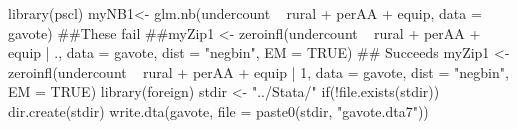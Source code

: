 \begin{Schunk}
\begin{Sinput}
 library(pscl)
 myNB1<- glm.nb(undercount ~ rural + perAA + equip, data = gavote)
 ##These fail
 ##myZip1 <- zeroinfl(undercount ~ rural + perAA + equip | ., data = gavote, dist = "negbin", EM = TRUE)
 ## Succeeds
 myZip1 <- zeroinfl(undercount ~ rural + perAA + equip | 1, data = gavote, dist = "negbin", EM = TRUE)
 library(foreign)
 stdir <- "../Stata/"
 if(!file.exists(stdir)) dir.create(stdir)
 write.dta(gavote, file = paste0(stdir, "gavote.dta7"))
\end{Sinput}
\end{Schunk}
